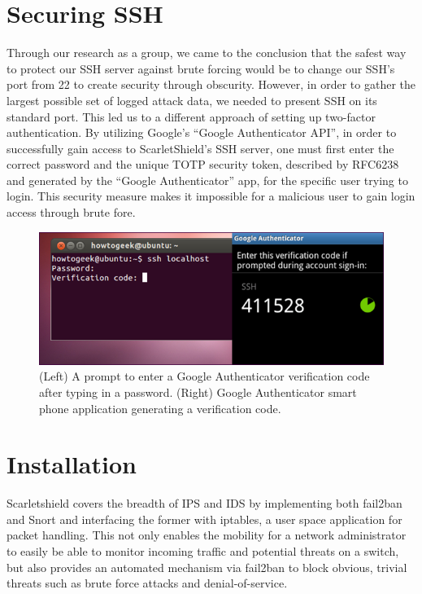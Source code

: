 \documentclass[12pt,letterpaper,titlepage]{report}
\begin{document}
{\section{Securing SSH}

Through our research as a group, we came to the conclusion that the safest way
to protect our SSH  server against brute forcing would be to change our SSH’s
port from 22 to create security through obscurity.  However, 
in order to gather the largest possible set of logged attack data,
we needed to present SSH on its standard port.
This led us to a different approach of setting up two-factor
authentication.  By utilizing Google’s ``Google Authenticator API'', 
in order to successfully
gain access to ScarletShield’s SSH server, one must first enter the correct
password and the unique TOTP security token, described by RFC6238 and generated by the
``Google Authenticator'' app, for the specific user trying to login.  This security
measure makes it impossible for a malicious user to gain login access through
brute fore.

\begin{figure}[h!]
\centering
  \includegraphics{./goodleauth.png}
  \caption{(Left) A prompt to enter a Google Authenticator verification
  code after typing in a password. (Right) Google Authenticator smart phone application
  generating a verification code.}
\end{figure}

\section{Installation}

Scarletshield covers the breadth of IPS and IDS by implementing both fail2ban
and Snort and interfacing the former with iptables, a user space application for
packet handling.  This not only enables the mobility for a network administrator
to easily be able to monitor incoming traffic and potential threats on a switch,
but also provides an automated mechanism via fail2ban to block obvious, trivial
threats such as brute force attacks and denial-of-service.

}
\end{document}
